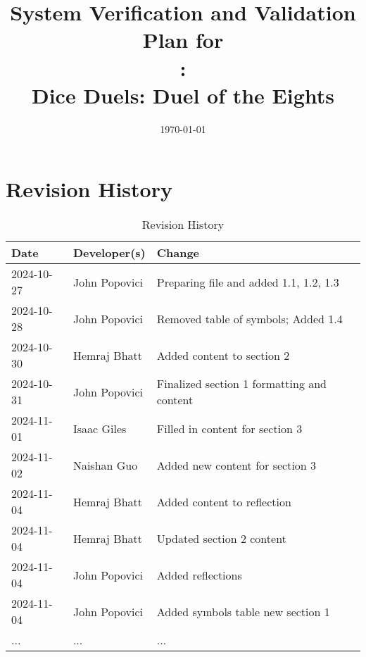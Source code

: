 \documentclass[12pt, titlepage]{article}
\begin{document}
\title{System Verification and Validation Plan for \\\progname: \\Dice Duels: Duel of the Eights} 
\author{\authname}
\date{\today}
	
\maketitle


\section*{Revision History}

\begin{table}[hp]
\caption{Revision History} \label{TblRevisionHistory}
\begin{tabularx}{\textwidth}{llX}
\toprule
\textbf{Date} & \textbf{Developer(s)} & \textbf{Change}\\
\midrule
2024-10-27 & John Popovici & Preparing file and added 1.1, 1.2, 1.3\\
2024-10-28 & John Popovici & Removed table of symbols; Added 1.4\\
2024-10-30 & Hemraj Bhatt & Added content to section 2\\
2024-10-31 & John Popovici & Finalized section 1 formatting and content\\
2024-11-01 & Isaac Giles & Filled in content for section 3\\
2024-11-02 & Naishan Guo & Added new content for section 3\\
2024-11-04 & Hemraj Bhatt & Added content to reflection \\
2024-11-04 & Hemraj Bhatt & Updated section 2 content \\
2024-11-04 & John Popovici & Added reflections \\
2024-11-04 & John Popovici & Added symbols table new section 1 \\
... & ... & ...\\
\bottomrule
\end{tabularx}
\end{table}

~\\
\iffalse
{}
\end{document}
